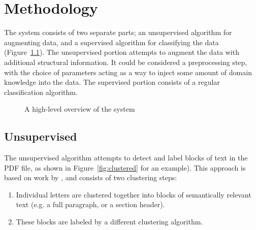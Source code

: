 \chapter{Methodology}

The system consists of two separate parts; an unsupervised algorithm for
augmenting data, and a supervised algorithm for classifying the data
(Figure~\ref{fig:overview}). The unsupervised portion attempts to augment the
data with additional structural information. It could be considered a
preprocessing step, with the choice of parameters acting as a way to inject some
amount of domain knowledge into the data. The supervised portion consists of a
regular classification algorithm. 

\begin{figure}[htbp]
  \centering
  \caption{A high-level overview of the system}
  \label{fig:overview}
\end{figure}

\section{Unsupervised}
The unsupervised algorithm attempts to detect and label blocks of text in the
PDF file, as shown in Figure~\ref{fig:clustered} for an example). This approach
is based on work by \textcite{klampfl2014unsupervised}, and consists of two
clustering steps:
\begin{enumerate}
\item Individual letters are clustered together into blocks of semantically
  relevant text (e.g. a full paragraph, or a section header).
\item These blocks are labeled by a different clustering algorithm.
\end{enumerate}

